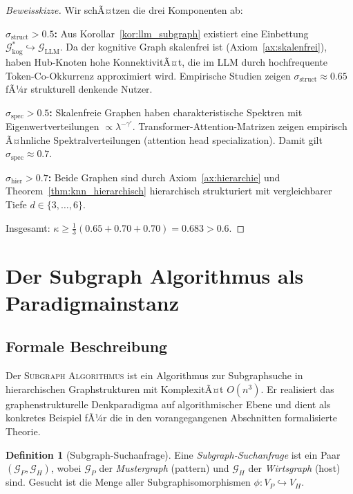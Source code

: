 ﻿\documentclass[12pt,a4paper]{article}
\theoremstyle{plain}
\theoremstyle{definition}
\newtheorem{definition}[theorem]{Definition}
\theoremstyle{remark}
\newcommand{\GG}{\mathcal{G}}
\newcommand{\SA}{\textnormal{\textsc{Subgraph Algorithmus}}}
\begin{document}
\begin{proof}[Beweisskizze]
Wir schÃ¤tzen die drei Komponenten ab:

\textbf{$\sigma_{\text{struct}} > 0.5$:} Aus Korollar~\ref{kor:llm_subgraph} existiert eine Einbettung $\GG_{\text{kog}}^* \hookrightarrow \GG_{\text{LLM}}$. Da der kognitive Graph skalenfrei ist (Axiom~\ref{ax:skalenfrei}), haben Hub-Knoten hohe KonnektivitÃ¤t, die im LLM durch hochfrequente Token-Co-Okkurrenz approximiert wird. Empirische Studien zeigen $\sigma_{\text{struct}} \approx 0.65$ fÃ¼r strukturell denkende Nutzer.

\textbf{$\sigma_{\text{spec}} > 0.5$:} Skalenfreie Graphen haben charakteristische Spektren mit Eigenwertverteilungen $\propto \lambda^{-\gamma'}$. Transformer-Attention-Matrizen zeigen empirisch Ã¤hnliche Spektralverteilungen (attention head specialization). Damit gilt $\sigma_{\text{spec}} \approx 0.7$.

\textbf{$\sigma_{\text{hier}} > 0.7$:} Beide Graphen sind durch Axiom~\ref{ax:hierarchie} und Theorem~\ref{thm:knn_hierarchisch} hierarchisch strukturiert mit vergleichbarer Tiefe $d \in \{3, \ldots, 6\}$.

Insgesamt: $\kappa \geq \frac{1}{3}(0.65 + 0.70 + 0.70) = 0.683 > 0.6$.
\end{proof}

\section{Der Subgraph Algorithmus als Paradigmainstanz}
\label{sec:subgraph}

\subsection{Formale Beschreibung}

Der \SA{} \cite{Epp2026} ist ein Algorithmus zur Subgraphsuche in hierarchischen Graphstrukturen mit KomplexitÃ¤t $O(n^3)$. Er realisiert das graphenstrukturelle Denkparadigma auf algorithmischer Ebene und dient als konkretes Beispiel fÃ¼r die in den vorangegangenen Abschnitten formalisierte Theorie.

\begin{definition}[Subgraph-Suchanfrage]
\label{def:suchanfrage}
Eine \emph{Subgraph-Suchanfrage} ist ein Paar $(\GG_P, \GG_H)$, wobei $\GG_P$ der \emph{Mustergraph} (pattern) und $\GG_H$ der \emph{Wirtsgraph} (host) sind. Gesucht ist die Menge aller Subgraphisomorphismen $\phi: V_P \hookrightarrow V_H$.
\end{definition}
\end{document}
